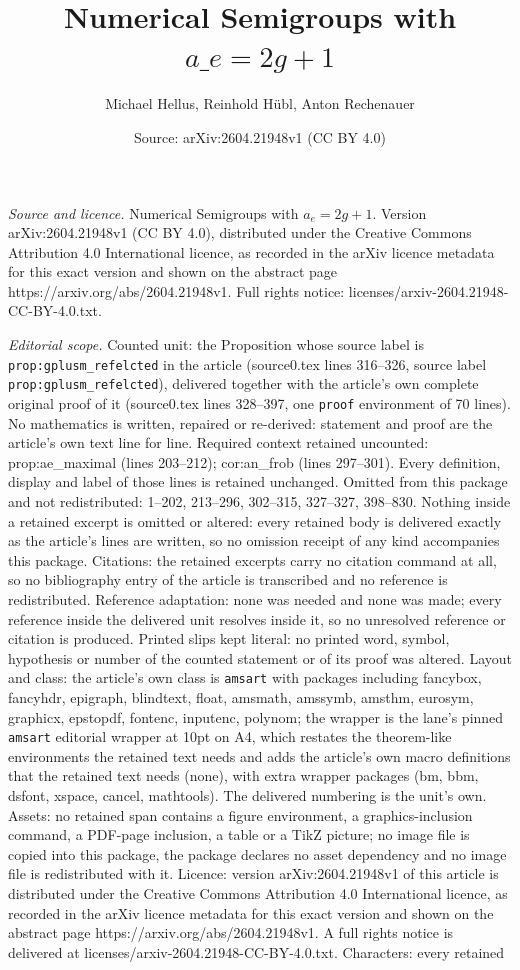 \documentclass[10pt,a4paper]{amsart}
\title[Numerical Semigroups with $a\_e = 2g+1$]{Numerical Semigroups with $a\_e = 2g+1$}
\author{Michael Hellus, Reinhold H\"ubl, Anton Rechenauer}
\date{Source: arXiv:2604.21948v1 (CC BY 4.0)}
\begin{document}
\maketitle

\noindent\emph{Source and licence.} Numerical Semigroups with $a_e = 2g+1$. Version arXiv:2604.21948v1 (CC BY 4.0), distributed under the Creative Commons Attribution 4.0 International licence, as recorded in the arXiv licence metadata for this exact version and shown on the abstract page https://arxiv.org/abs/2604.21948v1. Full rights notice: licenses/arxiv-2604.21948-CC-BY-4.0.txt.\par\smallskip

\noindent\textit{Editorial scope.} Counted unit: the Proposition whose source label is \texttt{prop:gplusm\_refelcted} in the article (source0.tex lines 316--326, source label \texttt{prop:gplusm\_refelcted}), delivered together with the article's own complete original proof of it (source0.tex lines 328--397, one \texttt{proof} environment of 70 lines). No mathematics is written, repaired or re-derived: statement and proof are the article's own text line for line. Required context retained uncounted: prop:ae\_maximal (lines 203--212); cor:an\_frob (lines 297--301). Every definition, display and label of those lines is retained unchanged. Omitted from this package and not redistributed: 1--202, 213--296, 302--315, 327--327, 398--830. Nothing inside a retained excerpt is omitted or altered: every retained body is delivered exactly as the article's lines are written, so no omission receipt of any kind accompanies this package. Citations: the retained excerpts carry no citation command at all, so no bibliography entry of the article is transcribed and no reference is redistributed. Reference adaptation: none was needed and none was made; every reference inside the delivered unit resolves inside it, so no unresolved reference or citation is produced. Printed slips kept literal: no printed word, symbol, hypothesis or number of the counted statement or of its proof was altered. Layout and class: the article's own class is \texttt{amsart} with packages including fancybox, fancyhdr, epigraph, blindtext, float, amsmath, amssymb, amsthm, eurosym, graphicx, epstopdf, fontenc, inputenc, polynom; the wrapper is the lane's pinned \texttt{amsart} editorial wrapper at 10pt on A4, which restates the theorem-like environments the retained text needs and adds the article's own macro definitions that the retained text needs (none), with extra wrapper packages (bm, bbm, dsfont, xspace, cancel, mathtools). The delivered numbering is the unit's own. Assets: no retained span contains a figure environment, a graphics-inclusion command, a PDF-page inclusion, a table or a TikZ picture; no image file is copied into this package, the package declares no asset dependency and no image file is redistributed with it. Licence: version arXiv:2604.21948v1 of this article is distributed under the Creative Commons Attribution 4.0 International licence, as recorded in the arXiv licence metadata for this exact version and shown on the abstract page https://arxiv.org/abs/2604.21948v1. A full rights notice is delivered at licenses/arxiv-2604.21948-CC-BY-4.0.txt. Characters: every retained 
\end{document}
